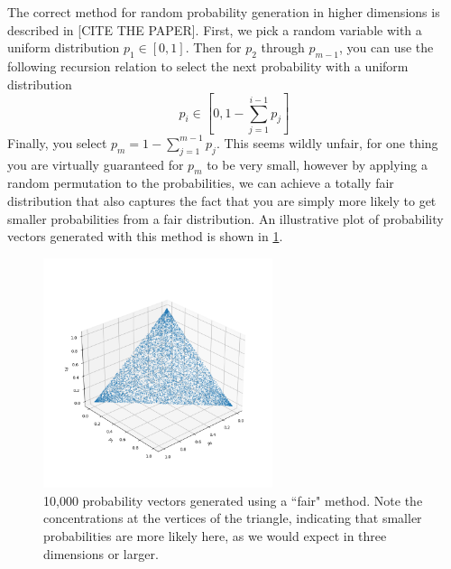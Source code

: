 \documentclass{paper}[11pt]
\begin{document}
	The correct method for random probability generation in higher dimensions is described in [CITE THE PAPER].
	First, we pick a random variable with a uniform distribution $p_1\in[0,1]$. Then for $p_2$ through $p_{m-1}$, you can use the following recursion relation to select the next probability with a uniform distribution
	\begin{equation*}
		p_i \in \left[0, 1 - \sum_{j=1}^{i-1} p_j\right]
	\end{equation*}
	Finally, you select $p_m = 1-\sum_{j=1}^{m-1} p_j$. This seems wildly unfair, for one thing you are virtually guaranteed for $p_m$ to be very small, however by applying a random permutation to the probabilities, we can achieve a totally fair distribution that also captures the fact that you are simply more likely to get smaller probabilities from a fair distribution. An illustrative plot of probability vectors generated with this method is shown in \cref{fig:prob_vecs_fair}.
	
	\begin{figure}[ht]
		\centering
		\includegraphics[width=0.6\textwidth]{prob_vecs_Fair.png}
		\caption{10,000 probability vectors generated using a ``fair" method. Note the concentrations at the vertices of the triangle, indicating that smaller probabilities are more likely here, as we would expect in three dimensions or larger.}
		\label{fig:prob_vecs_fair}
	\end{figure}

	
	
	
	
	
	
	
	
	
	
	
	
	
	
	
	
	
	
\end{document}
